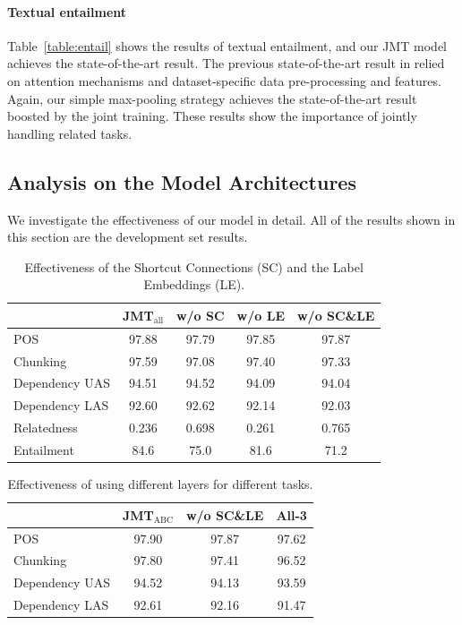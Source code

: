 \documentclass[11pt,a4paper]{article}
\begin{document}
\paragraph{Textual entailment}
Table~\ref{table:entail} shows the results of textual entailment, and our JMT model achieves the state-of-the-art result.
The previous state-of-the-art result in \citet{yin2016abcnn} relied on attention mechanisms and dataset-specific data pre-processing and features.
Again, our simple max-pooling strategy achieves the state-of-the-art result boosted by the joint training.
These results show the importance of jointly handling related tasks.


\subsection{Analysis on the Model Architectures}
We investigate the effectiveness of our model in detail.
All of the results shown in this section are the development set results.

\begin{table}[t]
{\scriptsize
	\begin{center}
	\begin{tabular}{l|c|ccc}
  			   & JMT$_{\mathrm{all}}$ & w/o SC & w/o LE & w/o SC\&LE \\ \hline
    POS        & 97.88 & 97.79 		& 97.85 & 97.87\\ \hline
    Chunking   & 97.59 & 97.08 		& 97.40 & 97.33 \\ \hline
    Dependency UAS & 94.51 & 94.52 	& 94.09 & 94.04 \\
    Dependency LAS & 92.60 & 92.62 	& 92.14 & 92.03  \\ \hline
    Relatedness    & 0.236 & 0.698 	& 0.261 & 0.765 \\ \hline
    Entailment     & 84.6  & 75.0 	& 81.6  & 71.2  \\ \hline
  \end{tabular}
  \end{center}
}
    \caption{Effectiveness of the Shortcut Connections (SC) and the Label Embeddings (LE).}
    \label{tb:shortcut_comp}
\end{table}

\begin{table}[t]
{\scriptsize
	\begin{center}
  \begin{tabular}{l|c|cc}
  			  		 & JMT$_{\mathrm{ABC}}$  & w/o SC\&LE  & All-3  \\ \hline
    POS        	     & 97.90				 & 97.87       & 97.62 \\ \hline
    Chunking         & 97.80				 & 97.41       & 96.52 \\ \hline
    Dependency UAS   & 94.52				 & 94.13       & 93.59 \\
    Dependency LAS   & 92.61				 & 92.16       & 91.47 \\ \hline
  \end{tabular}
  \end{center}
}
    \caption{Effectiveness of using different layers for different tasks.}
    \label{tb:diff_arch}
\end{table}
\end{document}
